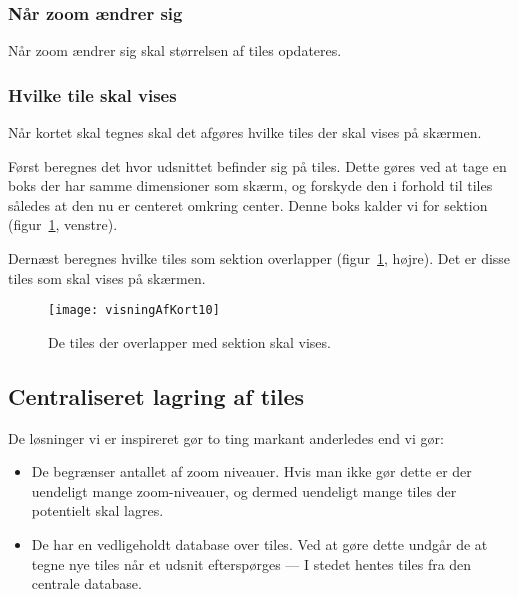 \subsubsection{Når zoom ændrer sig}
\label{subsec:naarZoomAendrerSig}

Når zoom ændrer sig skal størrelsen af tiles opdateres. 

\subsubsection{Hvilke tile skal vises}
\label{subsec:hvilkeTilesSkalVises}

Når kortet skal tegnes skal det afgøres hvilke tiles der skal vises på skærmen.

Først beregnes det hvor udsnittet befinder sig på tiles. Dette gøres ved at tage en boks der har samme dimensioner som skærm, og forskyde den i forhold til tiles således at den nu er centeret omkring center. Denne boks kalder vi for sektion (figur~\ref{figur:visningAfKort10}, venstre).

Dernæst beregnes hvilke tiles som sektion overlapper (figur~\ref{figur:visningAfKort10}, højre). Det er disse tiles som skal vises på skærmen.

\begin{figure}[h]
	\centering
	\texttt{[image: visningAfKort10]}
	\captionsetup{width=0.8\textwidth}
	\caption{De tiles der overlapper med sektion skal vises.}
	\label{figur:visningAfKort10}
\end{figure}

\subsection{Centraliseret lagring af tiles}
\label{subsec:centraliseretLagringAfTiles}

De løsninger vi er inspireret gør to ting markant anderledes end vi gør:

\begin{itemize}
	\item De begrænser antallet af zoom niveauer. Hvis man ikke gør dette er der uendeligt mange zoom-niveauer, og dermed uendeligt mange tiles der potentielt skal lagres.
	\item De har en vedligeholdt database over tiles. Ved at gøre dette undgår de at tegne nye tiles når et udsnit efterspørges --- I stedet hentes tiles fra den centrale database.
\end{itemize}

